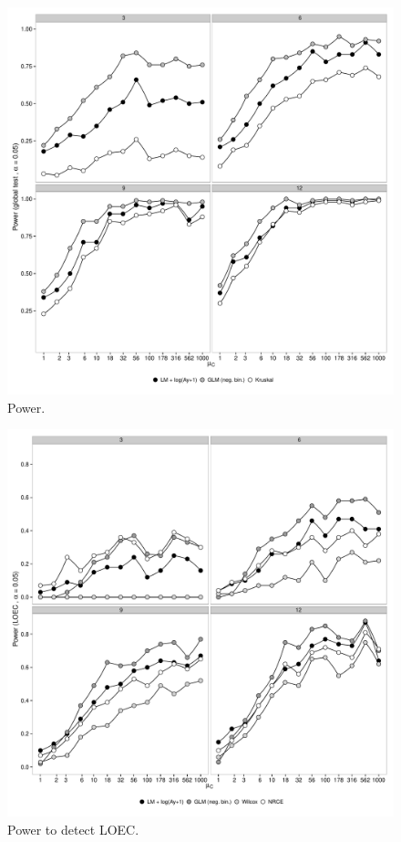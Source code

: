 \documentclass{scrartcl}\usepackage[]{graphicx}\usepackage[]{color}
\begin{document}
\begin{figure}
  \includegraphics[width = \textwidth]{p2.pdf}
  \caption{Power.}
\end{figure}

\begin{figure}
  \includegraphics[width = \textwidth]{p3.pdf}
  \caption{Power to detect LOEC.}
\end{figure}
\end{document}
